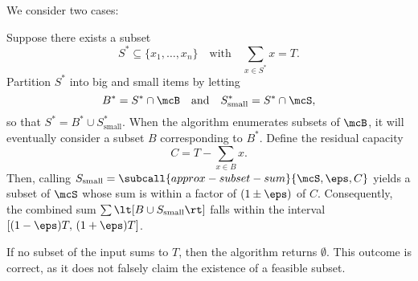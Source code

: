 \documentclass{article}
\begin{document}
\begin{solution}
  \begin{subproof}[Correctness]
  We consider two cases:

     Suppose there exists a subset
    \[
    S^* \subseteq \{x_1, \dots, x_n\} \quad \text{with} \quad \sum_{x \in S^*} x = T.
    \]
    Partition $ S^* $ into big and small items by letting
    \[
    B^* = S^* \cap \mcB \quad \text{and} \quad S^*_{\text{small}} = S^* \cap \mcS,
    \]
    so that $ S^* = B^* \cup S^*_{\text{small}} $.
    When the algorithm enumerates subsets of $ \mcB $, it will eventually consider a subset $ B $ corresponding to $ B^* $.
    Define the residual capacity
    \[
    C = T - \sum_{x \in B} x.
    \]
    Then, calling $ S_{\text{small}} = \subcall{approx-subset-sum}{\mcS, \eps, C} $ yields a subset of $ \mcS $ whose sum is within a factor of $ (1\pm\eps) $ of $ C $.
    Consequently, the combined sum $ \sum \lt[B \cup S_{\text{small}}\rt] $ falls within the interval $ [(1-\eps)T,\,(1+\eps)T] $.

     If no subset of the input sums to $ T $, then the algorithm returns $ \emptyset $.
    This outcome is correct, as it does not falsely claim the existence of a feasible subset.
  \end{subproof}
\end{solution}
\pagebreak
\end{document}
